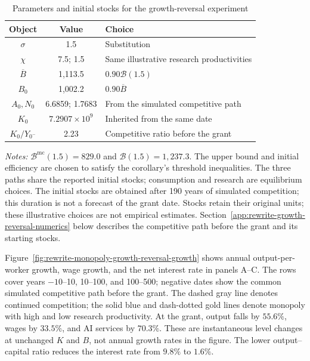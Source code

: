\begin{table}[H]
 \centering
 \caption{Parameters and initial stocks for the growth-reversal experiment}
 \label{tab:rewrite-monopoly-growth-reversal}
 \small{}
 \begin{tabular}{ccl}
 \toprule
 Object & Value & Choice\\
 \midrule
 $\sigma$ & 1.5 & Substitution\\
 $\chi$ & 7.5; 1.5 & Same illustrative research productivities\\
 $\overline B$ & 1,113.5 & $0.90\mathcal B(1.5)$\\
 $B_0$ & 1,002.2 & $0.90\overline B$\\
 $A_0,N_0$ & 6.6859; 1.7683 & From the simulated competitive path\\
 $K_0$ & $7.2907\times10^9$ & Inherited from the same date\\
 $K_0/Y_{0^-}$ & 2.23 & Competitive ratio before the grant\\
 \bottomrule
 \end{tabular}
 \par\vspace{4pt}
 \parbox{0.95\textwidth}{\footnotesize\emph{Notes:}
 $\mathcal B^{\mathrm{mc}}(1.5)=829.0$ and
 $\mathcal B(1.5)=1,237.3$. The upper bound and initial efficiency
 are chosen to satisfy the corollary's threshold inequalities.
 The three paths share the reported initial stocks; consumption
 and research are equilibrium choices. The initial stocks are obtained
 after 190 years of simulated competition; this duration is not a forecast
 of the grant date.
 Stocks retain their original units; these illustrative choices are
 not empirical estimates. Section~\ref{app:rewrite-growth-reversal-numerics}
 below describes the competitive path before the grant and its starting stocks.}
\end{table}

Figure~\ref{fig:rewrite-monopoly-growth-reversal-growth} shows annual
output-per-worker growth, wage growth, and the net interest rate in
panels A--C. The rows cover years $-10$--10, 10--100, and 100--500;
negative dates show the common simulated competitive path before the grant.
The dashed gray line denotes continued competition; the solid blue
and dash-dotted gold lines denote monopoly with high and low research
productivity. At the grant, output falls by $55.6\%$, wages by
$33.5\%$, and AI services by $70.3\%$. These are instantaneous level
changes at unchanged $K$ and $B$, not annual growth rates in the figure.
The lower output--capital ratio reduces the interest rate from
$9.8\%$ to $1.6\%$.

